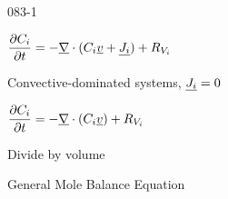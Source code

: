 \begin{mitframe}{083-1}
    
\begin{listone}
	\item $\dfrac{\partial\conc_{\state}}{\partial\timet}=-\gradop\cdot(\conc_{\state}\uline{\vvel}+\uline{\molspecflux})+\gasconst_{\vol_{\state}}$

    \begin{listtwo}
        \item Convective-dominated systems, $\uline{\molspecflux}=0$
	\end{listtwo}
    
    	\begin{listthree}
        	\item $\dfrac{\partial\conc_{\state}}{\partial\timet}=-\gradop\cdot(\conc_{\state}\uline{\vvel})+\gasconst_{\vol_{\state}}$
			\item Divide by volume
				\begin{listfour}
					\item General Mole Balance Equation
				\end{listfour}
		\end{listthree}
	
    
\end{listone}    

\end{mitframe}